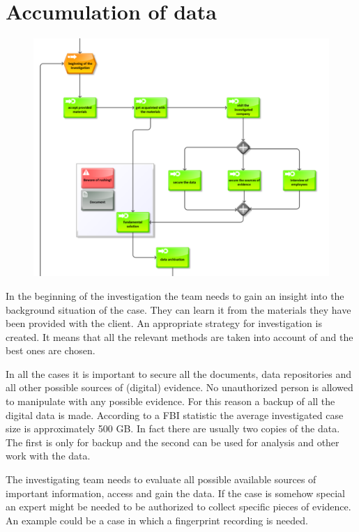 \section{Accumulation of data}
\begin{figure}[bh!t]
	\begin{center} 
	\includegraphics[width=1.0\textwidth]{img/metodika/metodika2.pdf}
	\end{center}
\end{figure}
In the beginning of the investigation the team needs to gain an insight into the background situation of the case. They can learn it from the materials they have been provided with the client. An appropriate strategy for investigation is created. It means that all the relevant methods are taken into account of and the best ones are chosen. 

In all the cases it is important to secure all the documents, data repositories and all other possible sources of (digital) evidence. No unauthorized person is allowed to manipulate with any possible evidence. For this reason a backup of all the digital data is made. According to a FBI statistic the average investigated case size is approximately 500 GB. \cite{ariu} In fact there are usually two copies of the data. The first is only for backup and the second can be used for analysis and other work with the data. 

The investigating team needs to evaluate all possible available sources of important information, access and gain the data. If the case is somehow special an expert might be needed to be authorized to collect specific pieces of evidence. An example could be a case in which a fingerprint recording is needed. 


